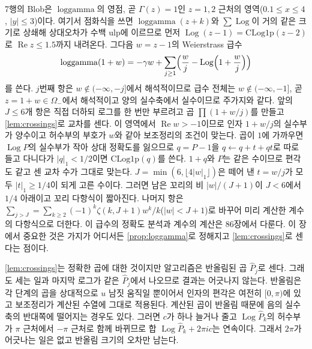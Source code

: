 7행의 \textrm{Blob}은 $\operatorname{loggamma}$의 영점, 곧 $\Gamma(z)=1$인 $z=1,2$ 근처의 영역($0.1\le x\le4$, $|y|\le3$)이다. 여기서 점화식을 쓰면 $\operatorname{loggamma}(z+k)$와 $\sum\operatorname{Log}$이 거의 같은 크기로 상쇄해 상대오차가 수백 ulp에 이르므로 먼저 $\operatorname{Log}(z-1)=\textrm{CLog1p}(z-2)$로 $\operatorname{Re}z\le1.5$까지 내려온다. 그다음 $w=z-1$의 Weierstrass 급수
\[
\operatorname{loggamma}(1+w)=-\gamma w+\sum_{j\ge1}\Bigl(\frac wj-\operatorname{Log}\Bigl(1+\frac wj\Bigr)\Bigr)
\]
를 쓴다. $j$번째 항은 $w\notin(-\infty,-j]$에서 해석적이므로 급수 전체는 $w\notin(-\infty,-1]$, 곧 $z=1+w\in\Omega_-$에서 해석적이고 양의 실수축에서 실수이므로 주가지와 같다. 앞의 $J\le6$개 항은 직접 더하되 로그를 한 번만 부르려고 곱 $\prod(1+w/j)$를 만들고 \cref{lem:crossings}로 교차를 센다. 이 영역에서 $\operatorname{Re}w>-1$이므로 인자 $1+w/j$의 실수부가 양수이고 허수부의 부호가 $w$와 같아 보조정리의 조건이 맞는다. 곱이 $1$에 가까우면 $\operatorname{Log}P$의 실수부가 작아 상대 정확도를 잃으므로 $q=P-1$을 $q\gets q+t+qt$로 따로 들고 다니다가 $|q|_1<1/2$이면 $\textrm{CLog1p}(q)$를 쓴다. $1+q$와 $P$는 같은 수이므로 편각도 같고 센 교차 수가 그대로 맞는다. $J=\min(6,\lfloor4|w|_1\rfloor)$은 떼어 낸 $t=w/j$가 모두 $|t|_1\ge1/4$이 되게 고른 수이다. 그러면 남은 꼬리의 비 $|w|/(J+1)$이 $J<6$에서 $1/4$ 아래이고 꼬리 다항식이 짧아진다. 나머지 항은 $\sum_{j>J}=\sum_{k\ge2}(-1)^k\zeta(k,J+1)w^k/k$($|w|<J+1$)로 바꾸어 미리 계산한 계수의 다항식으로 더한다. 이 급수의 정확도 분석과 계수의 계산은 86장에서 다룬다. 이 장에서 중요한 것은 가지가 어디서든 \cref{prop:loggamma}로 정해지고 \cref{lem:crossings}로 센다는 점이다.

\cref{lem:crossings}는 정확한 곱에 대한 것이지만 알고리즘은 반올림된 곱 $\widehat P_j$로 센다. 그래도 세는 일과 마지막 로그가 같은 $\widehat P_j$에서 나오므로 결과는 어긋나지 않는다. 반올림은 각 단계의 곱을 상대적으로 $u$ 남짓 움직일 뿐이어서 인자의 편각은 여전히 $[0,\pi)$에 있고 보조정리가 계산된 수열에 그대로 적용된다. 계산된 곱이 반올림 때문에 음의 실수축의 반대쪽에 떨어지는 경우도 있다. 그러면 $c$가 하나 늘거나 줄고 $\operatorname{Log}\widehat P_k$의 허수부가 $\pi$ 근처에서 $-\pi$ 근처로 함께 바뀌므로 합 $\operatorname{Log}\widehat P_k+2\pi ic$는 연속이다. 그래서 $2\pi$가 어긋나는 일은 없고 반올림 크기의 오차만 남는다.

